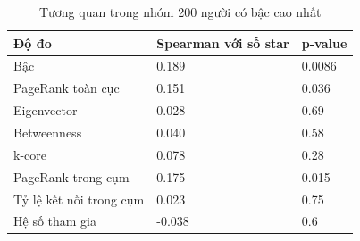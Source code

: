 \begin{table}[htbp]
\caption{Tương quan trong nhóm 200 người có bậc cao nhất}
\label{tab:rq3_within_top}
\begin{tabular}{lll}
\toprule
Độ đo & Spearman với số star & p-value \\
\midrule
Bậc & 0.189 & 0.0086 \\
PageRank toàn cục & 0.151 & 0.036 \\
Eigenvector & 0.028 & 0.69 \\
Betweenness & 0.040 & 0.58 \\
k-core & 0.078 & 0.28 \\
PageRank trong cụm & 0.175 & 0.015 \\
Tỷ lệ kết nối trong cụm & 0.023 & 0.75 \\
Hệ số tham gia & -0.038 & 0.6 \\
\bottomrule
\end{tabular}
\end{table}

